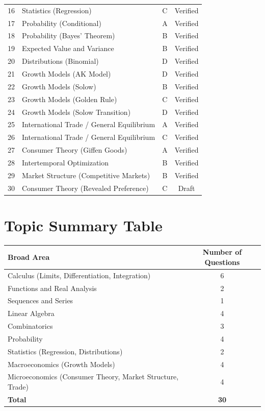 \documentclass[11pt]{article}
\begin{document}
\begin{center}
\begin{longtable}{c l c c}
16 & Statistics (Regression)                   & C & Verified \\
17 & Probability (Conditional)                 & A & Verified \\
18 & Probability (Bayes' Theorem)              & B & Verified \\
19 & Expected Value and Variance               & B & Verified \\
20 & Distributions (Binomial)                  & D & Verified \\
21 & Growth Models (AK Model)                  & D & Verified \\
22 & Growth Models (Solow)                     & B & Verified \\
23 & Growth Models (Golden Rule)               & C & Verified \\
24 & Growth Models (Solow Transition)          & D & Verified \\
25 & International Trade / General Equilibrium & A & Verified \\
26 & International Trade / General Equilibrium & C & Verified \\
27 & Consumer Theory (Giffen Goods)            & A & Verified \\
28 & Intertemporal Optimization                & B & Verified \\
29 & Market Structure (Competitive Markets)    & B & Verified \\
30 & Consumer Theory (Revealed Preference)     & C & Draft    \\
\bottomrule
\end{longtable}
\end{center}

\newpage

\section*{Topic Summary Table}

\begin{center}
\begin{tabular}{l c}
\toprule
\textbf{Broad Area} & \textbf{Number of Questions} \\
\midrule
Calculus (Limits, Differentiation, Integration) & 6 \\
Functions and Real Analysis & 2 \\
Sequences and Series & 1 \\
Linear Algebra & 4 \\
Combinatorics & 3 \\
Probability & 4 \\
Statistics (Regression, Distributions) & 2 \\
Macroeconomics (Growth Models) & 4 \\
Microeconomics (Consumer Theory, Market Structure, Trade) & 4 \\
\midrule
\textbf{Total} & \textbf{30} \\
\bottomrule
\end{tabular}
\end{center}
\end{document}
